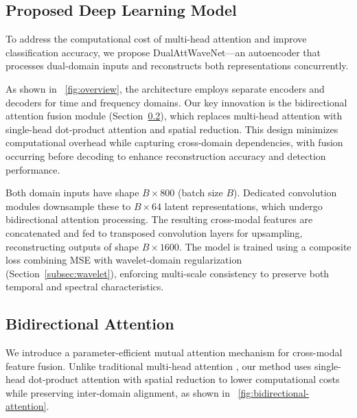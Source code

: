 \documentclass[conference]{IEEEtran}
\begin{document}

\subsection{Proposed Deep Learning Model}
\label{subsec:proposed_model}

To address the computational cost of multi-head attention and improve classification accuracy, we propose DualAttWaveNet—an autoencoder that processes dual-domain inputs and reconstructs both representations concurrently.

As shown in \figurename~\ref{fig:overview}, the architecture employs separate encoders and decoders for time and frequency domains. Our key innovation is the bidirectional attention fusion module (Section~\ref{subsec:bi_attn}), which replaces multi-head attention with single-head dot-product attention and spatial reduction. This design minimizes computational overhead while capturing cross-domain dependencies, with fusion occurring before decoding to enhance reconstruction accuracy and detection performance.

Both domain inputs have shape $B \times 800$ (batch size $B$). Dedicated convolution modules downsample these to $B \times 64$ latent representations, which undergo bidirectional attention processing. The resulting cross-modal features are concatenated and fed to transposed convolution layers for upsampling, reconstructing outputs of shape $B \times 1600$. The model is trained using a composite loss combining MSE with wavelet-domain regularization (Section~\ref{subsec:wavelet}), enforcing multi-scale consistency to preserve both temporal and spectral characteristics.

\subsection{Bidirectional Attention}
\label{subsec:bi_attn}

We introduce a parameter-efficient mutual attention mechanism for cross-modal feature fusion. Unlike traditional multi-head attention \cite{vaswaniAttentionAllYou2017}, our method uses single-head dot-product attention with spatial reduction to lower computational costs while preserving inter-domain alignment, as shown in \figurename~\ref{fig:bidirectional-attention}.
\end{document}

